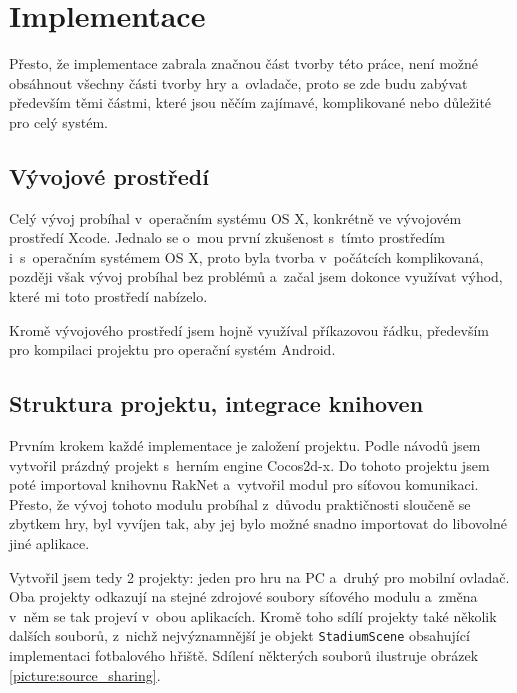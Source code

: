 \documentclass[thesis=B,czech,hidelinks]{FITthesis}[2012/06/26] %
\newcommand{\code}[1]{\texttt{#1}}
\begin{document}
\section{Implementace}

Přesto, že implementace zabrala značnou část tvorby této práce, není možné obsáhnout všechny části tvorby hry a~ovladače, proto se zde budu zabývat především těmi částmi, které jsou něčím zajímavé, komplikované nebo důležité pro celý systém.

\subsection{Vývojové prostředí}

Celý vývoj probíhal v~operačním systému OS X, konkrétně ve vývojovém prostředí Xcode. Jednalo se o~mou první zkušenost s~tímto prostředím i~s~operačním systémem OS X, proto byla tvorba v~počátcích komplikovaná, později však vývoj probíhal bez problémů a~začal jsem dokonce využívat výhod, které mi toto prostředí nabízelo.

Kromě vývojového prostředí jsem hojně využíval příkazovou řádku, především pro kompilaci projektu pro operační systém Android.

\subsection{Struktura projektu, integrace knihoven}

Prvním krokem každé implementace je založení projektu. Podle návodů jsem vytvořil prázdný projekt s~herním engine Cocos2d-x. Do tohoto projektu jsem poté importoval knihovnu RakNet a~vytvořil modul pro síťovou komunikaci. Přesto, že vývoj tohoto modulu probíhal z~důvodu praktičnosti sloučeně se zbytkem hry, byl vyvíjen tak, aby jej bylo možné snadno importovat do libovolné jiné aplikace.

Vytvořil jsem tedy 2 projekty: jeden pro hru na PC a~druhý pro mobilní ovladač. Oba projekty odkazují na stejné zdrojové soubory síťového modulu a~změna v~něm se tak projeví v~obou aplikacích. Kromě toho sdílí projekty také několik dalších souborů, z~nichž nejvýznamnější je objekt \code{StadiumScene} obsahující implementaci fotbalového hřiště. Sdílení některých souborů ilustruje obrázek \ref{picture:source_sharing}.
\end{document}
